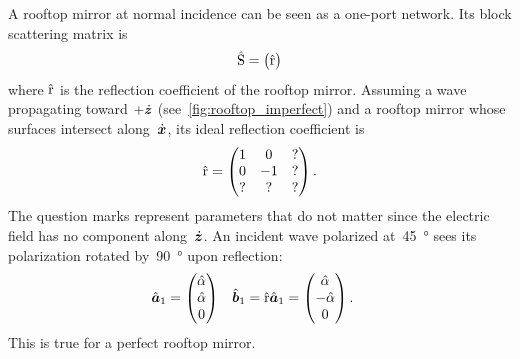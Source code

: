 A rooftop mirror at normal incidence can be seen as a one-port network.
Its block scattering matrix is
\begin{equation}
    \hat{\mathrm{S}} =
    \begin{pmatrix}
        \hat{\mathrm{r}}
    \end{pmatrix}
\end{equation}
where $\hat{\mathrm{r}}$ is the reflection coefficient of the rooftop mirror.
Assuming a wave propagating toward $+\dot{\bm{z}}$ (see~\cref{fig:rooftop_imperfect}) and a rooftop mirror whose surfaces intersect along~$\dot{\bm{x}}$,
its ideal reflection coefficient is
\begin{equation}
    \hat{\mathrm{r}} =
    \begin{pmatrix}
        1 &  0 & ?\\
        0 & -1 & ?\\
        ? &  ? & ?
    \end{pmatrix}
    \text{.}
\end{equation}
The question marks represent parameters that do not matter since the electric field has no component along~$\dot{\bm{z}}$.
An incident wave polarized at~\SI{45}{\degree} sees its polarization rotated by~\SI{90}{\degree} upon reflection:
\begin{align}
    \hat{\bm{a}}_1
    &=
    \begin{pmatrix}
        \hat{\alpha} \\ \hat{\alpha} \\ 0
    \end{pmatrix}
    &
    \hat{\bm{b}}_1
    &= \hat{\mathrm{r}} \hat{\bm{a}}_1
    =
    \begin{pmatrix}
        \hat{\alpha} \\ -\hat{\alpha} \\ 0
    \end{pmatrix}
    \text{.}
\end{align}
This is true for a perfect rooftop mirror.

